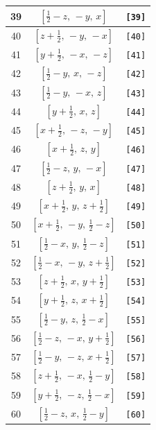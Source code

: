\documentclass[fleqn,8pt]{jsarticle}
\begin{document}
\begin{longtable}{ccc}
39 & $\left[ \frac{1}{2} - z,\, - y,\, x \right]$ & {\tt [39]} \\ \hline
40 & $\left[ z + \frac{1}{2},\, - y,\, - x \right]$ & {\tt [40]} \\ \hline
41 & $\left[ y + \frac{1}{2},\, - x,\, - z \right]$ & {\tt [41]} \\ \hline
42 & $\left[ \frac{1}{2} - y,\, x,\, - z \right]$ & {\tt [42]} \\ \hline
43 & $\left[ \frac{1}{2} - y,\, - x,\, z \right]$ & {\tt [43]} \\ \hline
44 & $\left[ y + \frac{1}{2},\, x,\, z \right]$ & {\tt [44]} \\ \hline
45 & $\left[ x + \frac{1}{2},\, - z,\, - y \right]$ & {\tt [45]} \\ \hline
46 & $\left[ x + \frac{1}{2},\, z,\, y \right]$ & {\tt [46]} \\ \hline
47 & $\left[ \frac{1}{2} - z,\, y,\, - x \right]$ & {\tt [47]} \\ \hline
48 & $\left[ z + \frac{1}{2},\, y,\, x \right]$ & {\tt [48]} \\ \hline
49 & $\left[ x + \frac{1}{2},\, y,\, z + \frac{1}{2} \right]$ & {\tt [49]} \\ \hline
50 & $\left[ x + \frac{1}{2},\, - y,\, \frac{1}{2} - z \right]$ & {\tt [50]} \\ \hline
51 & $\left[ \frac{1}{2} - x,\, y,\, \frac{1}{2} - z \right]$ & {\tt [51]} \\ \hline
52 & $\left[ \frac{1}{2} - x,\, - y,\, z + \frac{1}{2} \right]$ & {\tt [52]} \\ \hline
53 & $\left[ z + \frac{1}{2},\, x,\, y + \frac{1}{2} \right]$ & {\tt [53]} \\ \hline
54 & $\left[ y + \frac{1}{2},\, z,\, x + \frac{1}{2} \right]$ & {\tt [54]} \\ \hline
55 & $\left[ \frac{1}{2} - y,\, z,\, \frac{1}{2} - x \right]$ & {\tt [55]} \\ \hline
56 & $\left[ \frac{1}{2} - z,\, - x,\, y + \frac{1}{2} \right]$ & {\tt [56]} \\ \hline
57 & $\left[ \frac{1}{2} - y,\, - z,\, x + \frac{1}{2} \right]$ & {\tt [57]} \\ \hline
58 & $\left[ z + \frac{1}{2},\, - x,\, \frac{1}{2} - y \right]$ & {\tt [58]} \\ \hline
59 & $\left[ y + \frac{1}{2},\, - z,\, \frac{1}{2} - x \right]$ & {\tt [59]} \\ \hline
60 & $\left[ \frac{1}{2} - z,\, x,\, \frac{1}{2} - y \right]$ & {\tt [60]} \\ \hline

\end{longtable}
\end{document}
